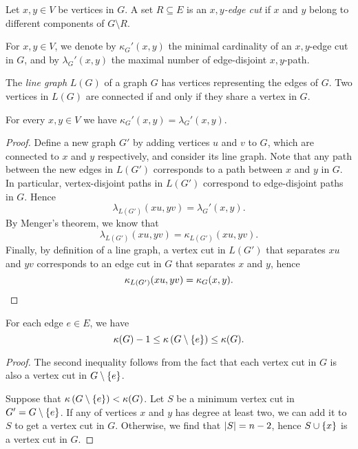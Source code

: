 \begin{definicija}
Let $x, y \in V$ be vertices in $G$. A set $R \subseteq E$ is an
\emph{$x,y$-edge cut} if $x$ and $y$ belong to
different components of $G \setminus R$.
\end{definicija}


\begin{definicija}
For $x, y \in V$, we denote by $\kappa_G'(x,y)$ the minimal
cardinality of an $x,y$-edge cut in $G$, and by
$\lambda_G'(x,y)$ the maximal number of edge-disjoint $x,y$-path.
\end{definicija}

\begin{definicija}
The \emph{line graph} $L(G)$ of a graph $G$ has
vertices representing the edges of $G$. Two vertices in $L(G)$ are
connected if and only if they share a vertex in $G$.
\end{definicija}

\begin{izrek}[Menger]
For every $x, y \in V$ we have $\kappa_G'(x,y) = \lambda_G'(x,y)$.
\end{izrek}

\begin{proof}
Define a new graph $G'$ by adding vertices $u$ and $v$ to $G$,
which are connected to $x$ and $y$ respectively, and consider its
line graph. Note that any path between the new edges in $L(G')$
corresponds to a path between $x$ and $y$ in $G$. In particular,
vertex-disjoint paths in $L(G')$ correspond to edge-disjoint paths
in $G$. Hence
\[
\lambda_{L(G')}(xu, yv) = \lambda_G'(x,y).
\]
By Menger's theorem, we know that
\[
\lambda_{L(G')}(xu, yv) = \kappa_{L(G')}(xu, yv).
\]
Finally, by definition of a line graph, a vertex cut in $L(G')$
that separates $xu$ and $yv$ corresponds to an edge cut in $G$ that
separates $x$ and $y$, hence
\[
\kappa_{L(G')}(xu, yv) = \kappa_G(x,y). \qedhere
\]
\end{proof}

\begin{lema}
For each edge $e \in E$, we have
\[
\kappa(G) - 1 \leq \kappa \left(G \setminus \left\{e\right\}\right) \leq \kappa(G).
\]
\end{lema}

\begin{proof}
The second inequality follows from the fact that each vertex cut in
$G$ is also a vertex cut in $G \setminus \left\{e\right\}$.

Suppose that $\kappa \left(G \setminus \left\{e\right\}\right) < \kappa(G)$. Let $S$
be a minimum vertex cut in $G' = G \setminus \left\{e\right\}$. If any of
vertices $x$ and $y$ has degree at least two, we can add it to $S$
to get a vertex cut in $G$. Otherwise, we find that
$\left\lvert S\right\rvert = n-2$, hence $S \cup \left\{x\right\}$ is a vertex cut in $G$.
\end{proof}

